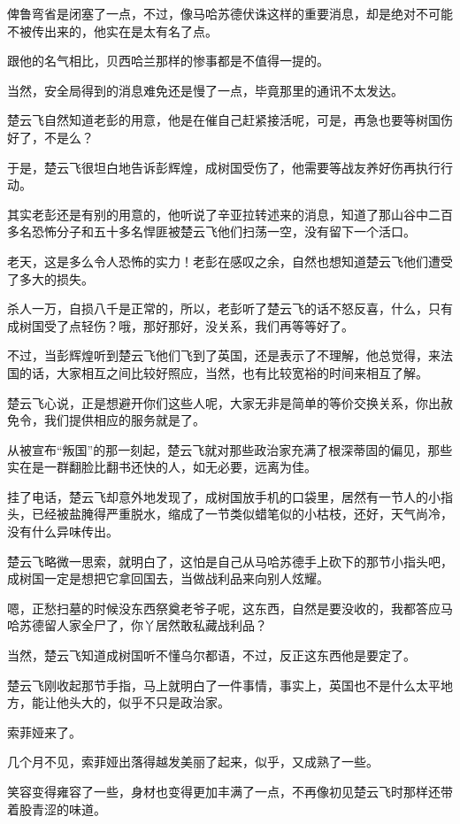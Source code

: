 俾鲁弯省是闭塞了一点，不过，像马哈苏德伏诛这样的重要消息，却是绝对不可能不被传出来的，他实在是太有名了点。

跟他的名气相比，贝西哈兰那样的惨事都是不值得一提的。

当然，安全局得到的消息难免还是慢了一点，毕竟那里的通讯不太发达。

楚云飞自然知道老彭的用意，他是在催自己赶紧接活呢，可是，再急也要等树国伤好了，不是么？

于是，楚云飞很坦白地告诉彭辉煌，成树国受伤了，他需要等战友养好伤再执行行动。

其实老彭还是有别的用意的，他听说了辛亚拉转述来的消息，知道了那山谷中二百多名恐怖分子和五十多名悍匪被楚云飞他们扫荡一空，没有留下一个活口。

老天，这是多么令人恐怖的实力！老彭在感叹之余，自然也想知道楚云飞他们遭受了多大的损失。

杀人一万，自损八千是正常的，所以，老彭听了楚云飞的话不怒反喜，什么，只有成树国受了点轻伤？哦，那好那好，没关系，我们再等等好了。

不过，当彭辉煌听到楚云飞他们飞到了英国，还是表示了不理解，他总觉得，来法国的话，大家相互之间比较好照应，当然，也有比较宽裕的时间来相互了解。

楚云飞心说，正是想避开你们这些人呢，大家无非是简单的等价交换关系，你出赦免令，我们提供相应的服务就是了。

从被宣布“叛国”的那一刻起，楚云飞就对那些政治家充满了根深蒂固的偏见，那些实在是一群翻脸比翻书还快的人，如无必要，远离为佳。

挂了电话，楚云飞却意外地发现了，成树国放手机的口袋里，居然有一节人的小指头，已经被盐腌得严重脱水，缩成了一节类似蜡笔似的小枯枝，还好，天气尚冷，没有什么异味传出。

楚云飞略微一思索，就明白了，这怕是自己从马哈苏德手上砍下的那节小指头吧，成树国一定是想把它拿回国去，当做战利品来向别人炫耀。

嗯，正愁扫墓的时候没东西祭奠老爷子呢，这东西，自然是要没收的，我都答应马哈苏德留人家全尸了，你丫居然敢私藏战利品？

当然，楚云飞知道成树国听不懂乌尔都语，不过，反正这东西他是要定了。

楚云飞刚收起那节手指，马上就明白了一件事情，事实上，英国也不是什么太平地方，能让他头大的，似乎不只是政治家。

索菲娅来了。

几个月不见，索菲娅出落得越发美丽了起来，似乎，又成熟了一些。

笑容变得雍容了一些，身材也变得更加丰满了一点，不再像初见楚云飞时那样还带着股青涩的味道。


